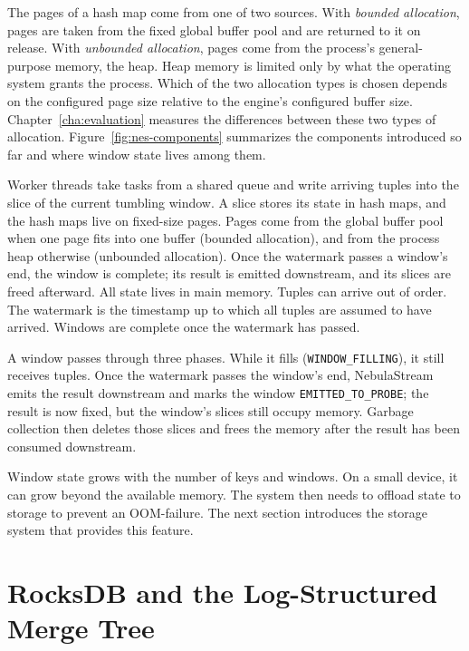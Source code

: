 The pages of a hash map come from one of two sources.
With \emph{bounded allocation}, pages are taken from the fixed global buffer pool and are returned to it on release.
With \emph{unbounded allocation}, pages come from the process's general-purpose memory, the heap.
Heap memory is limited only by what the operating system grants the process.
Which of the two allocation types is chosen depends on the configured page size relative to the engine's configured buffer size.
Chapter~\ref{cha:evaluation} measures the differences between these two types of allocation.
Figure~\ref{fig:nes-components} summarizes the components introduced so far and where window state lives among them.



Worker threads take tasks from a shared queue and write arriving tuples
into the slice of the current tumbling window. A slice stores its state in hash
maps, and the hash maps live on fixed-size pages. Pages come from the global
buffer pool when one page fits into one buffer (bounded allocation), and from
the process heap otherwise (unbounded allocation). Once the watermark passes a
window's end, the window is complete; its result is emitted downstream, and its
slices are freed afterward. All state lives in main memory.
Tuples can arrive out of order.
The watermark is the timestamp up to which all tuples are assumed to have arrived.
Windows are complete once the watermark has passed.

A window passes through three phases.
While it fills (\texttt{WINDOW\_FILLING}), it still receives tuples.
Once the watermark passes the window's end, NebulaStream emits the result downstream and marks the window \texttt{EMITTED\_TO\_PROBE}; the result is now fixed, but the window's slices still occupy memory.
Garbage collection then deletes those slices and frees the memory after the result has been consumed downstream.

Window state grows with the number of keys and windows.
On a small device, it can grow beyond the available memory.
The system then needs to offload state to storage to prevent an \ac{OOM}-failure.
The next section introduces the storage system that provides this feature.

\section{RocksDB and the Log-Structured Merge Tree\label{sec:bg-rocksdb}}

